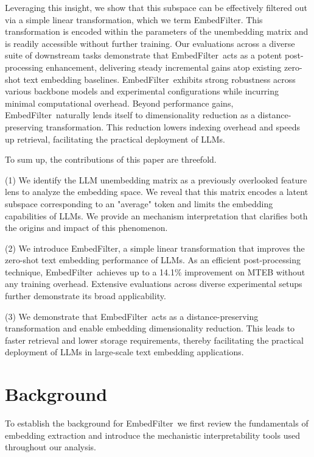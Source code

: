 \documentclass[sigconf]{acmart}
\newcommand{\name}{EmbedFilter}
\begin{document}
Leveraging this insight, we show that this subspace can be effectively filtered out via a simple linear transformation, which we term \name.
This transformation is encoded within the parameters of the unembedding matrix and is readily accessible without further training.
Our evaluations across a diverse suite of downstream tasks demonstrate that \name\ acts as a potent post-processing enhancement, delivering steady incremental gains atop existing zero-shot text embedding baselines.
\name\ exhibits strong robustness across various backbone models and experimental configurations while incurring minimal computational overhead.
Beyond performance gains, \name\ naturally lends itself to dimensionality reduction as a distance-preserving transformation.
This reduction lowers indexing overhead and speeds up retrieval, facilitating the practical deployment of LLMs.

To sum up, the contributions of this paper are threefold.

(1) We identify the LLM unembedding matrix as a previously overlooked feature lens to analyze the embedding space.
We reveal that this matrix encodes a latent subspace corresponding to an "average" token and limits the embedding capabilities of LLMs.
We provide an mechanism interpretation that clarifies both the origins and impact of this phenomenon.

(2) We introduce \name, a simple linear transformation that improves the zero-shot text embedding performance of LLMs.
As an efficient post-processing technique, \name\ achieves up to a 14.1\% improvement on MTEB without any training overhead. 
Extensive evaluations across diverse experimental setups further demonstrate its broad applicability.

(3) We demonstrate that \name\ acts as a distance-preserving transformation and enable embedding dimensionality reduction. 
This leads to faster retrieval and lower storage requirements, thereby facilitating the practical deployment of LLMs in large-scale text embedding applications.

\section{Background}
\label{sec:bg}
To establish the background for \name\, we first review the fundamentals of embedding extraction and introduce the mechanistic interpretability tools used throughout our analysis.
\end{document}
